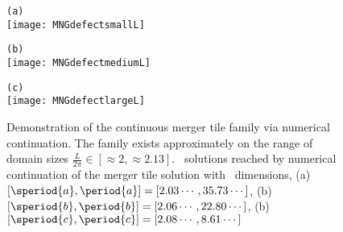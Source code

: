 \begin{figure}
\begin{minipage}[height=.2\textheight]{.3\textwidth}
\centering \small{\texttt{(a)}}\\
\texttt{[image: MNGdefectsmallL]}
\end{minipage}
\begin{minipage}[height=.2\textheight]{.3\textwidth}
\centering \small{\texttt{(b)}}\\
\texttt{[image: MNGdefectmediumL]}
\end{minipage}
\begin{minipage}[height=.2\textheight]{.3\textwidth}
\centering \small{\texttt{(c)}}\\
\texttt{[image: MNGdefectlargeL]}
\end{minipage}
\caption{ \label{fig:defectfamily}
Demonstration of the continuous merger tile family via numerical continuation.
The family exists approximately on the range of domain sizes $\frac{L}{2\pi} \in
[\approx 2, \approx 2.13]$. \twoT\ solutions reached by numerical continuation
of the merger tile solution with \spt\ dimensions,
(a) $[\speriod{a},\period{a}]=[2.03\cdots,35.73\cdots]$,
(b) $[\speriod{b},\period{b}]=[2.06\cdots,22.80\cdots]$,
(b) $[\speriod{c},\period{c}]=[2.08\cdots,8.61\cdots]$
}
\end{figure}

